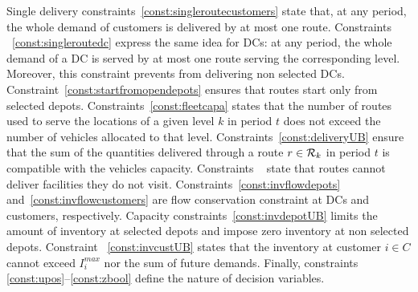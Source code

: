 \documentclass[a4paper,10pt]{article}
\begin{document}
\begin{linenumbers}
Single delivery constraints~\eqref{const:singleroutecustomers} state that, at any period, the whole demand of customers is delivered by at most one route. 
%
Constraints ~\eqref{const:singleroutedc} express the same idea for DCs: at any period, the whole demand of a DC is served by at most one route serving the corresponding level. Moreover, this constraint prevents from delivering non selected DCs. 
%
Constraint~\eqref{const:startfromopendepots} ensures that routes start only from selected depots. 
%
Constraints~\eqref{const:fleetcapa} states that the number of routes used to serve the locations of a given level $k$ in period $t$ does not exceed the number of vehicles allocated to that level. 
%
Constraints~\eqref{const:deliveryUB} ensure that the sum of the quantities delivered through a route $r\in\mathcal{R}_k$ in period $t$ is compatible with the vehicles capacity. 
%
Constraints ~\label{const:deliveryConstLoc}  state that routes cannot deliver facilities they do not visit. 
%
Constraints~\eqref{const:invflowdepots} and~\eqref{const:invflowcustomers} are flow conservation constraint at DCs and customers, respectively. 
%
Capacity constraints~\eqref{const:invdepotUB} limits the amount of inventory at selected depots and impose zero inventory at non selected depots. 
%
Constraint ~\eqref{const:invcustUB} states that the inventory at customer $i \in C$ cannot exceed $I_i^{max}$ nor the sum of future demands. 
%
Finally, constraints \ref{const:upos}--\ref{const:zbool} define the nature of decision variables. 






\end{linenumbers}
\end{document}
